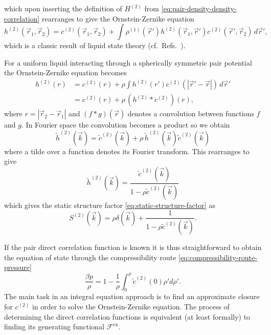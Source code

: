 which upon inserting the definition of $H^{(2)}$ from \eqref{eq:pair-density-density-correlation} rearranges to give the Ornstein-Zernike equation
\begin{equation}\label{eq:ornstein-zernike-generic}
  h^{(2)}(\vec{r}_1, \vec{r}_2) =
  c^{(2)}(\vec{r}_1, \vec{r}_2) +
  \int
  \rho^{(1)}(\vec{r}')
  h^{(2)}(\vec{r}_1, \vec{r}')
  c^{(2)}(\vec{r}', \vec{r}_2)
  \, d\vec{r}',
\end{equation}
which is a classic result of liquid state theory (cf.\ Refs.\ \cite{OrnsteinPASA1914,Hansen2013,EvansAP1979}).

\vspace{0.5em}

\begin{tcolorbox}[title=Ornstein-Zernike equation for a uniform simple liquid]
For a uniform liquid interacting through a spherically symmetric pair potential the Ornstein-Zernike equation becomes
\begin{equation}\label{eq:ornstein-zernike-spherical}
  \begin{split}
    h^{(2)}(r)
    &=
    c^{(2)}(r) +
    \rho
    \int
    h^{(2)}(r')
    c^{(2)}(|\vec{r}' - \vec{r}|)
    \, d\vec{r}'
    \\ &=
    c^{(2)}(r) + \rho \, (h^{(2)} * c^{(2)})(r),
  \end{split}
\end{equation}
where $r = |\vec{r}_2 - \vec{r}_1|$ and $(f*g)(\vec{r})$ denotes a convolution between functions $f$ and $g$.
In Fourier space the convolution becomes a product so we obtain
\begin{equation*}
  \widetilde{h}^{(2)}(\vec{k})
  =
  \widetilde{c}^{(2)}(\vec{k}) +
  \rho \, \widetilde{h}^{(2)}(\vec{k}) \widetilde{c}^{(2)}(\vec{k})
\end{equation*}
where a tilde over a function denotes its Fourier transform.
This rearranges to give
\begin{equation*}
  \widetilde{h}^{(2)}(\vec{k})
  =
  \frac{\widetilde{c}^{(2)}(\vec{k})}{1 - \rho \widetilde{c}^{(2)}(\vec{k})}
\end{equation*}
which gives the static structure factor \eqref{eq:static-structure-factor} as
\begin{equation*}
  S^{(2)}(\vec{k})
  =
  \rho \delta(\vec{k}) +
  \frac{1}{1 - \rho \widetilde{c}^{(2)}(\vec{k})}.
\end{equation*}
\end{tcolorbox}

If the pair direct correlation function is known it is thus straightforward to obtain the equation of state through the compressibility route \eqref{eq:compressibility-route-pressure}
\begin{equation*}
  \frac{\beta p}{\rho}
  =
  1 - \frac{1}{\rho} \int_0^\rho \widetilde{c}^{(2)}(0) \rho' d\rho'.
\end{equation*}
The main task in an integral equation approach is to find an approximate closure for $c^{(2)}$ in order to solve the Ornstein-Zernike equation.
The process of determining the direct correlation functions is equivalent (at least formally) to finding its generating functional $\mathcal{F}^\mathrm{ex}$.

